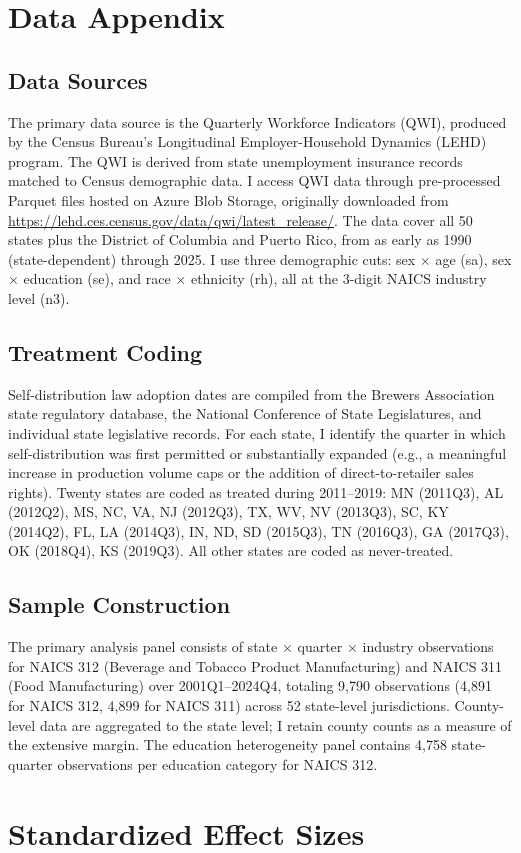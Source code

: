 \documentclass[12pt]{article}
\begin{document}
\label{apep_main_text_end}
\newpage


\newpage
\appendix

\section{Data Appendix}

\subsection{Data Sources}

The primary data source is the Quarterly Workforce Indicators (QWI), produced by the Census Bureau's Longitudinal Employer-Household Dynamics (LEHD) program. The QWI is derived from state unemployment insurance records matched to Census demographic data. I access QWI data through pre-processed Parquet files hosted on Azure Blob Storage, originally downloaded from \url{https://lehd.ces.census.gov/data/qwi/latest_release/}. The data cover all 50 states plus the District of Columbia and Puerto Rico, from as early as 1990 (state-dependent) through 2025. I use three demographic cuts: sex $\times$ age (sa), sex $\times$ education (se), and race $\times$ ethnicity (rh), all at the 3-digit NAICS industry level (n3).

\subsection{Treatment Coding}

Self-distribution law adoption dates are compiled from the Brewers Association state regulatory database, the National Conference of State Legislatures, and individual state legislative records. For each state, I identify the quarter in which self-distribution was first permitted or substantially expanded (e.g., a meaningful increase in production volume caps or the addition of direct-to-retailer sales rights). Twenty states are coded as treated during 2011--2019: MN (2011Q3), AL (2012Q2), MS, NC, VA, NJ (2012Q3), TX, WV, NV (2013Q3), SC, KY (2014Q2), FL, LA (2014Q3), IN, ND, SD (2015Q3), TN (2016Q3), GA (2017Q3), OK (2018Q4), KS (2019Q3). All other states are coded as never-treated.

\subsection{Sample Construction}

The primary analysis panel consists of state $\times$ quarter $\times$ industry observations for NAICS 312 (Beverage and Tobacco Product Manufacturing) and NAICS 311 (Food Manufacturing) over 2001Q1--2024Q4, totaling 9,790 observations (4,891 for NAICS 312, 4,899 for NAICS 311) across 52 state-level jurisdictions. County-level data are aggregated to the state level; I retain county counts as a measure of the extensive margin. The education heterogeneity panel contains 4,758 state-quarter observations per education category for NAICS 312.

\section{Standardized Effect Sizes}
\label{sec:sde}


\end{document}

